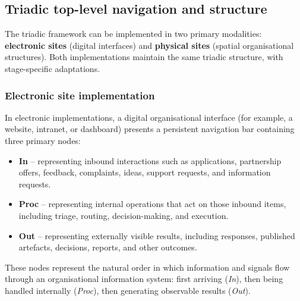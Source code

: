 \documentclass[11pt,a4paper]{article}
\begin{document}
\subsection*{Triadic top-level navigation and structure}

The triadic framework can be implemented in two primary modalities: \textbf{electronic sites} (digital interfaces) and \textbf{physical sites} (spatial organisational structures). Both implementations maintain the same triadic structure, with stage-specific adaptations.

\subsubsection*{Electronic site implementation}

In electronic implementations, a digital organisational interface (for example, a website, intranet, or dashboard) presents a persistent navigation bar containing three primary nodes:
\begin{itemize}[noitemsep]
  \item \textbf{In} -- representing inbound interactions such as applications, partnership offers, feedback, complaints, ideas, support requests, and information requests.
  \item \textbf{Proc} -- representing internal operations that act on those inbound items, including triage, routing, decision-making, and execution.
  \item \textbf{Out} -- representing externally visible results, including responses, published artefacts, decisions, reports, and other outcomes.
\end{itemize}

These nodes represent the natural order in which information and signals flow through an organisational information system: first arriving (\emph{In}), then being handled internally (\emph{Proc}), then generating observable results (\emph{Out}).
\end{document}
